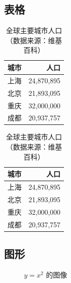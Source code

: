 \documentclass[
11pt,notheorems,hyperref={pdfauthor=whatever},aspectratio=169
]{beamer}
\begin{document}
\subsection{表格}
\begin{frame}
    \begin{table}
        \caption{全球主要城市人口（数据来源：维基百科）}
        \begin{tabular}{@{}lr@{}}
          \toprule
          城市 & 人口\\
          \midrule
          上海 & 24,870,895\\
          北京 & 21,893,095\\
          重庆 & 32,000,000\\
          成都 & 20,937,757\\
          \bottomrule
        \end{tabular}
        \hspace*{1cm}
        \setlength\extrarowheight{3pt}
        \begin{tabular}{|lr|}
          \hline
          \rowcolor{primary}\color{white}城市 & \color{white}人口\\
          \hline
          上海 & 24,870,895\\
          北京 & 21,893,095\\
          重庆 & 32,000,000\\
          成都 & 20,937,757\\
          \hline
        \end{tabular}
    \end{table}
\end{frame}

\subsection{图形}
\begin{frame}
    \begin{figure}[htbp]
        \centering
        \caption{$y=x^2$ 的图像}
    \end{figure}
\end{frame}
\end{document}
